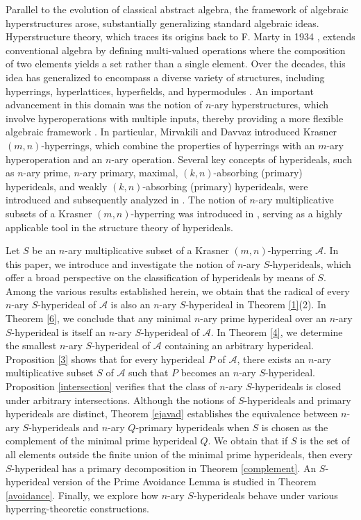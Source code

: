 \documentclass[preprint,review,10pt]{amsart}
\theoremstyle{definition}
\theoremstyle{remark}
\numberwithin{equation}{section}
\begin{document}
Parallel to the evolution of classical abstract algebra, the framework of algebraic hyperstructures arose, substantially generalizing standard algebraic ideas. Hyperstructure theory, which traces its origins back to F. Marty in 1934 \cite{s1}, extends conventional algebra by defining multi-valued operations where the composition of two elements  yields a set rather than a single element. Over the decades, this idea has generalized to encompass a diverse variety of structures, including hyperrings, hyperlattices, hyperfields, and hypermodules \cite{s3, davvaz1, Konstantindou, s4, s10}. An important advancement in this domain was the notion of $n$-ary hyperstructures, which involve hyperoperations with multiple inputs, thereby providing a more flexible algebraic framework \cite{s9,l1,l2}. In particular, Mirvakili and Davvaz \cite{d1} introduced Krasner $(m, n)$-hyperrings, which combine the properties of hyperrings with an $m$-ary hyperoperation and an $n$-ary operation. Several key concepts of hyperideals, such as $n$-ary prime, $n$-ary primary, maximal, $(k,n)$-absorbing (primary) hyperideals, and   weakly $(k,n)$-absorbing (primary) hyperideals, were introduced and subsequently analyzed in \cite{sorc1,davvazz,rev2}. The notion of $n$-ary multiplicative subsets of a Krasner $(m,n)$-hyperring  was introduced in \cite{sorc1}, serving as a highly applicable tool in the structure theory of hyperideals. 

Let $S$ be an $n$-ary multiplicative subset of a Krasner $(m,n)$-hyperring $\mathscr{A}$.
In this paper, we introduce and investigate the notion of $n$-ary $S$-hyperideals, which  offer a broad perspective on the classification of hyperideals by means of  $S$. Among the various results established  herein,  we obtain that the radical of every $n$-ary $S$-hyperideal of $\mathscr{A}$ is also an $n$-ary $S$-hyperideal in Theorem \ref{1}(2).
In Theorem \ref{6}, we conclude that any minimal $n$-ary prime hyperideal over an $n$-ary $S$-hyperideal is itself an $n$-ary $S$-hyperideal of $\mathscr{A}$.
In Theorem \ref{4}, we determine the smallest $n$-ary $S$-hyperideal of $\mathscr{A}$ containing an arbitrary hyperideal.
Proposition \ref{3} shows that for every hyperideal $P$ of $\mathscr{A}$, there exists  an $n$-ary multiplicative subset $S$ of $\mathscr{A}$ such that $P$ becomes an $n$-ary $S$-hyperideal. 
Proposition \ref{intersection} verifies   that the class of $n$-ary $S$-hyperideals is closed under arbitrary intersections.
Although the notions of $S$-hyperideals and primary hyperideals are distinct, Theorem \ref{ejavad} establishes the equivalence between $n$-ary $S$-hyperideals and $n$-ary $Q$-primary hyperideals when $S$ is chosen as the complement of the minimal prime hyperideal $Q$.
We obtain that if $S$ is the set of all elements outside the finite union of the minimal prime hyperideals, then every $S$-hyperideal has a primary decomposition in Theorem \ref{complement}.
An $S$-hyperideal version of the Prime Avoidance Lemma is studied in Theorem \ref{avoidance}. Finally, we explore how $n$-ary $S$-hyperideals behave under various hyperring-theoretic constructions.
\end{document}

